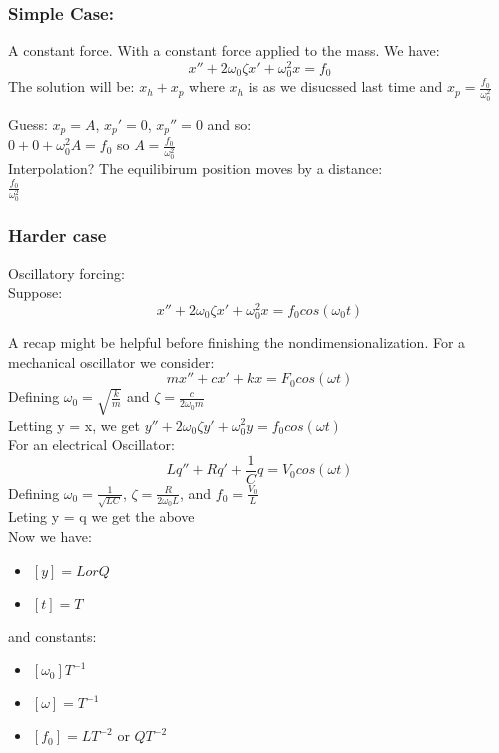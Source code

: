 \documentclass[12pt]{article}
\begin{document}
	\subsubsection*{Simple Case:}
	 A constant force. With a constant force applied to the mass. We have:\\
	
	$$x'' + 2\omega_0 \zeta x' + \omega_0^2 x = f_0$$
	The solution will be: $x_h + x_p$ where $x_h$ is as we disucssed last time and $x_p = \frac{f_0}{\omega_0^2}$
	
	Guess: $x_p = A$, $x_p' = 0$, $x_p'' = 0$ and so:\\
	$0 + 0 + \omega_0^2A = f_0$ so $A = \frac{f_0}{\omega_0^2}$\\
	Interpolation? The equilibirum position moves by a distance:\\
	$\frac{f_0}{\omega_0^2}$
	
	\subsubsection*{Harder case}
	Oscillatory forcing:\\
	Suppose:\\
	$$x'' + 2\omega_0 \zeta x' + \omega_0^2 x = f_0cos(\omega_0t)$$
	
	A recap might be helpful before finishing the nondimensionalization. For a mechanical oscillator we consider:\\
	$$mx'' + cx' + kx = F_0cos(\omega t)$$
	Defining $\omega_0 = \sqrt{\frac{k}{m}}$ and $\zeta = \frac{c}{2\omega_0 m}$\\
	Letting y = x, we get $y'' + 2\omega_0 \zeta y' + \omega_0^2 y = f_0 cos(\omega t)$\\
	
	For an electrical Oscillator:\\
	$$Lq'' + Rq' + \frac{1}{C}q = V_0 cos(\omega t)$$
	Defining $\omega_0 = \frac{1}{\sqrt{LC}}$, $\zeta = \frac{R}{2\omega_0 L}$, and $f_0 = \frac{V_0}{L}$\\
	Leting y = q we get the above\\
	
	Now we have:\\
	\begin{itemize}
		\item $[y] = L or Q$
		\item $[t] = T$
	\end{itemize}
	and constants:\\
	\begin{itemize}
		\item $[\omega_0] T^{-1}$
		\item $[\omega] = T^{-1}$
		\item $[f_0] = LT^{-2}$ or $QT^{-2}$
	\end{itemize}
\end{document}
